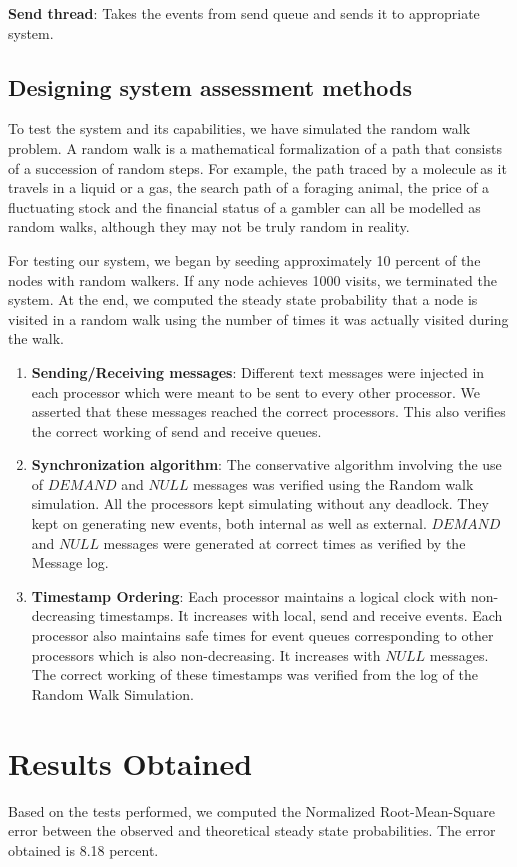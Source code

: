 \documentclass[12pt,a4paper]{article}
\begin{document}
\textbf{Send thread}: Takes the events from send queue and sends it to appropriate system.
	\subsection{Designing system assessment methods}
To test the system and its capabilities, we have simulated the random walk problem. A random walk is a mathematical formalization of a path that consists of a succession of random steps. For example, the path traced by a molecule as it travels in a liquid or a gas, the search path of a foraging animal, the price of a fluctuating stock and the financial status of a gambler can all be modelled as random walks, although they may not be truly random in reality.

For testing our system, we began by seeding approximately 10 percent of the nodes with random walkers. If any node achieves 1000 visits, we terminated the system. At the end, we computed the steady state probability that a node is visited in a random walk using the number of times it was actually visited during the walk.

\begin{enumerate}
	\item \textbf{Sending/Receiving messages}: Different text messages were injected in each processor which were meant to be sent to every other processor. We asserted that these messages reached the correct processors. This also verifies the correct working of send and receive queues.
	\item \textbf{Synchronization algorithm}: The conservative algorithm involving the use of $DEMAND$ and $NULL$ messages was verified using the Random walk simulation. All the processors kept simulating without any deadlock. They kept on generating new events, both internal as well as external. $DEMAND$ and $NULL$ messages were generated at correct times as verified by the Message log.
	\item \textbf{Timestamp Ordering}: Each processor maintains a logical clock with non-decreasing timestamps. It increases with local, send and receive events. Each processor also maintains safe times for event queues corresponding to other processors which is also non-decreasing. It increases with $NULL$ messages. The  correct working of these timestamps was verified from the log of the Random Walk Simulation.
\end{enumerate}

\section{Results Obtained}
Based on the tests performed, we computed the Normalized Root-Mean-Square error between the observed and theoretical steady state probabilities. The error obtained is 8.18 percent.
\end{document}
